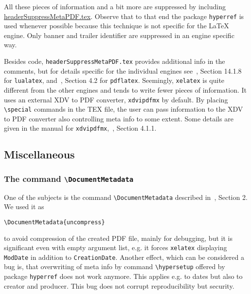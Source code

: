 \documentclass[a4paper, english]{article}%
\newcommand{\pdflatex}{\texttt{pdflatex}}
\newcommand{\lualatex}{\texttt{lualatex}}
\newcommand{\xelatex}{\texttt{xelatex}}
\newcommand{\cmd}[1]{\texttt{\textbackslash#1}}
\begin{document}
\begin{description}
\end{description}

All these pieces of information 
and a bit more are suppressed 
by including \href{\urlSite fromTex/headerSuppressMetaPDF.tex}{headerSuppressMetaPDF.tex}. 
Observe that to that end the package \texttt{hyperref} is used 
whenever possible because this technique is not specific for the \LaTeX{} engine. 
Only banner and trailer identifier are suppressed in an engine specific way. 

Besides code, \texttt{headerSuppressMetaPDF.tex} provides 
additional info in the comments, 
but for details specific for the individual engines 
see~\cite{LuaTexRef24}, Section 14.1.8 for \lualatex, 
and~\cite{PdfTexUsr24}, Section 4.2 for \pdflatex. 
Seemingly, \xelatex{} is quite different from the other engines 
and tends to write fewer pieces of information. 
It uses an external XDV to PDF converter, \texttt{xdvipdfmx} by default. 
By placing \cmd{special} commands in the TEX file, 
the user can pass information to the XDV to PDF converter 
also controlling meta info to some extent. 
Some details are given in the 
manual for \texttt{xdvipdfmx},~\cite{DviPdfMx}, Section 4.1.1. 



\subsection{Miscellaneous}\label{subsec:misc}

\subsubsection{The command \cmd{DocumentMetadata}}\label{subsubsec:docMeta}

One of the subjects is the command \cmd{DocumentMetadata} 
described in~\cite{DocMetaDataSuppCode}, Section 2. 
We used it as 
%
\begin{verbatim}
\DocumentMetadata{uncompress}
\end{verbatim}
%
to avoid compression of the created PDF file, mainly for debugging, 
but it is significant even with empty argument list, 
e.g. it forces \xelatex{} displaying \texttt{ModDate} in addition to \texttt{CreationDate}. 
Another effect, which can be considered a bug is, 
that overwriting of meta info by command \cmd{hypersetup} offered by package \texttt{hyperref} 
does not work anymore. 
This applies e.g. to dates but also to creator and producer. 
This bug does not corrupt reproducibility but security. 
\end{document}
